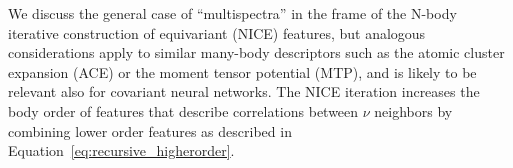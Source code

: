 We discuss the general case of ``multispectra'' in the frame of the N-body iterative construction of equivariant (NICE) features\cite{niga+20jcp}, but analogous considerations apply to similar many-body descriptors such as the atomic cluster expansion (ACE)\cite{drau19prb,dusson2022atomic} or the moment tensor potential (MTP)\cite{shapeev2016moment}, and is likely to be relevant also for covariant neural networks\cite{ande+19nips,mill2020arxiv}. 
The NICE iteration increases the body order of features that describe correlations between $\nu$ neighbors 
by combining lower order features as described in Equation~\eqref{eq:recursive_higherorder}.

